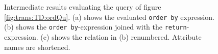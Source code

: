 \begin{myExample}
\begin{figure}[h]
\caption{Intermediate results evaluating the query of figure
\ref{fig:trans:TD:ordQu}. (a) shows the evaluated \texttt{order by} expression. (b) shows the \texttt{order
by}-expression joined with the \texttt{return}-expression. (c) shows the relation in (b) renumbered. Attribute
names are shortened.\label{fig:trans:TD:orderRes}}
\end{figure}


\end{myExample}
